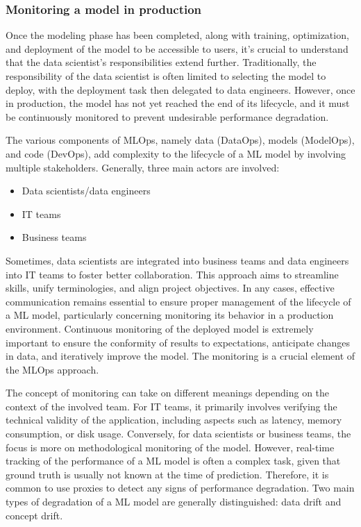 \subsubsection{Monitoring a model in production}


Once the modeling phase has been completed, along with training, optimization, and deployment of the model to be accessible to users, it's crucial to understand that the data scientist's responsibilities extend further. Traditionally, the responsibility of the data scientist is often limited to selecting the model to deploy, with the deployment task then delegated to data engineers. However, once in production, the model has not yet reached the end of its lifecycle, and it must be continuously monitored to prevent undesirable performance degradation.

The various components of MLOps, namely data (DataOps), models (ModelOps), and code (DevOps), add complexity to the lifecycle of a ML model by involving multiple stakeholders. Generally, three main actors are involved:

\begin{itemize}
    \item Data scientists/data engineers
    \item IT teams
    \item Business teams
\end{itemize}

Sometimes, data scientists are integrated into business teams and data engineers into IT teams to foster better collaboration. This approach aims to streamline skills, unify terminologies, and align project objectives. In any cases, effective communication remains essential to ensure proper management of the lifecycle of a ML model, particularly concerning monitoring its behavior in a production environment. Continuous monitoring of the deployed model is extremely important to ensure the conformity of results to expectations, anticipate changes in data, and iteratively improve the model. The monitoring is a crucial element of the MLOps approach.

The concept of monitoring can take on different meanings depending on the context of the involved team. For IT teams, it primarily involves verifying the technical validity of the application, including aspects such as latency, memory consumption, or disk usage. Conversely, for data scientists or business teams, the focus is more on methodological monitoring of the model. However, real-time tracking of the performance of a ML model is often a complex task, given that ground truth is usually not known at the time of prediction. Therefore, it is common to use proxies to detect any signs of performance degradation. Two main types of degradation of a ML model are generally distinguished: data drift and concept drift.

